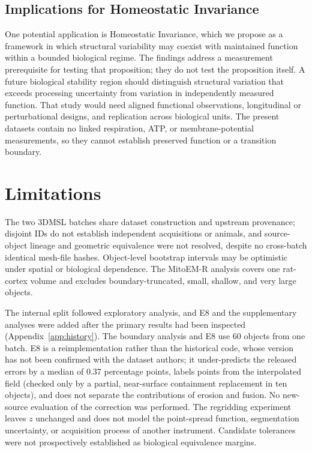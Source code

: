 \documentclass[journal]{IEEEtran}
\begin{document}
\subsection{Implications for Homeostatic Invariance}

One potential application is Homeostatic Invariance, which we propose as a framework in which structural variability may coexist with maintained function within a bounded biological regime. The findings address a measurement prerequisite for testing that proposition; they do not test the proposition itself. A future biological stability region should distinguish structural variation that exceeds processing uncertainty from variation in independently measured function. That study would need aligned functional observations, longitudinal or perturbational designs, and replication across biological units. The present datasets contain no linked respiration, ATP, or membrane-potential measurements, so they cannot establish preserved function or a transition boundary.

\section{Limitations}

The two 3DMSL batches share dataset construction and upstream provenance; disjoint IDs do not establish independent acquisitions or animals, and source-object lineage and geometric equivalence were not resolved, despite no cross-batch identical mesh-file hashes. Object-level bootstrap intervals may be optimistic under spatial or biological dependence. The MitoEM-R analysis covers one rat-cortex volume and excludes boundary-truncated, small, shallow, and very large objects.

The internal split followed exploratory analysis, and E8 and the supplementary analyses were added after the primary results had been inspected (Appendix~\ref{app:history}). The boundary analysis and E8 use 60 objects from one batch. E8 is a reimplementation rather than the historical code, whose version has not been confirmed with the dataset authors; it under-predicts the released errors by a median of 0.37 percentage points, labels points from the interpolated field (checked only by a partial, near-surface containment replacement in ten objects), and does not separate the contributions of erosion and fusion. No new-source evaluation of the correction was performed. The regridding experiment leaves $z$ unchanged and does not model the point-spread function, segmentation uncertainty, or acquisition process of another instrument. Candidate tolerances were not prospectively established as biological equivalence margins.
\end{document}
